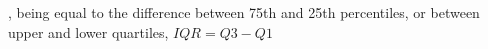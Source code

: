 , being equal to the difference between 75th and 25th percentiles, or between upper and lower quartiles, $IQR = Q3 −  Q1$